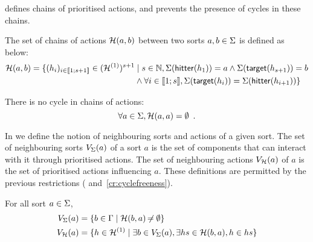  defines chains of prioritised actions,
and  prevents the presence of cycles in these chains.
\begin{definition}
\label{def:chainsactions}
  The set of chains of actions $\mathcal{H}(a, b)$ between two sorts $a, b \in \Sigma$ is defined as below:
  \begin{align*}
  \mathcal{H}(a, b) = \{ (h_i)_{i \in \llbracket 1; s+1 \rrbracket} \in (\mathcal{H}^{(1)})^{s+1} &\mid s \in \mathbb{N}, \Sigma(\mathsf{hitter}(h_1)) = a \wedge \Sigma(\mathsf{target}(h_{s+1})) = b \\
    & \wedge \forall i \in \llbracket 1; s \rrbracket, \Sigma(\mathsf{target}(h_{i})) = \Sigma(\mathsf{hitter}(h_{i+1})) \}
  \end{align*}
\end{definition}
\begin{criterion}
\label{cr:cyclefreeness}
  There is no cycle in chains of actions:
  $$\forall a \in \Sigma, \mathcal{H}(a, a) = \emptyset \enspace.$$
\end{criterion}

In  we define the notion of neighbouring sorts and actions of a given sort.
The set of neighbouring sorts $V_\Sigma(a)$ of a sort $a$ is the set of components that can interact with it through prioritised actions.
The set of neighbouring actions $V_{\mathcal{H}}(a)$ of $a$ is the set of prioritised actions influencing $a$.
These definitions are permitted by the previous restrictions ( and~\ref{cr:cyclefreeness}).
\begin{definition}[$\Vs : \PHs \rightarrow \powerset(\PHsort)$; $\Vh : \PHs \rightarrow \powerset(\PHh)$]
\label{def:neighbours}
  For all sort $a \in \Sigma$,
  \begin{align*}
    V_\Sigma(a) &= \{ b \in \Gamma \mid \mathcal{H}(b, a) \not\nobreak\mkern -2mu = \emptyset \}\\
    V_{\mathcal{H}}(a) &= \{ h \in \mathcal{H}^{(1)} \mid \exists b \in V_\Sigma(a), \exists hs \in \mathcal{H}(b,a), h \in hs \}
  \end{align*}
\end{definition}

